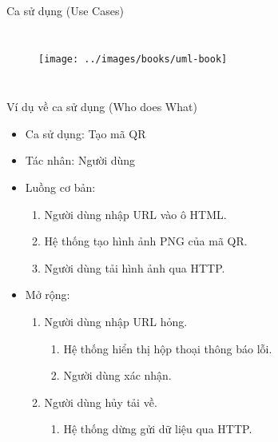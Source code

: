 \documentclass{beamer}
\begin{document}
\begin{frame}{Ca sử dụng (Use Cases)}
    \begin{columns}
        \begin{figure}
            \centering
            \texttt{[image: ../images/books/uml-book]}
        \end{figure}
        \end{columns}
\end{frame}

\begin{frame}{Ví dụ về ca sử dụng (Who does What)}
    \begin{block}{}
        \begin{itemize}
            \item Ca sử dụng: Tạo mã QR
            \item Tác nhân: Người dùng
            \item Luồng cơ bản:
            \begin{enumerate}
                \item Người dùng nhập URL vào ô HTML.
                \item Hệ thống tạo hình ảnh PNG của mã QR.
                \item Người dùng tải hình ảnh qua HTTP.
            \end{enumerate}
            \item Mở rộng:
            \begin{enumerate}
                \item Người dùng nhập URL hỏng.
                \begin{enumerate}
                    \item Hệ thống hiển thị hộp thoại thông báo lỗi.
                    \item Người dùng xác nhận.
                \end{enumerate}
                \item Người dùng hủy tải về.
                \begin{enumerate}
                    \item Hệ thống dừng gửi dữ liệu qua HTTP.
                \end{enumerate}
            \end{enumerate}
        \end{itemize}
    \end{block}
\end{frame}
\end{document}
